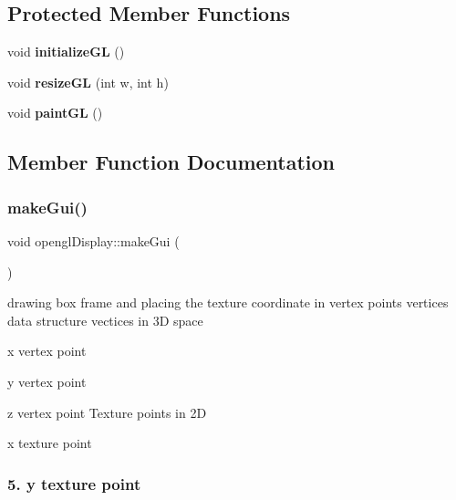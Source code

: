 \subsection*{Protected Member Functions}
\begin{DoxyCompactItemize}
\item 
\mbox{\label{classopengl_display_a348f99a1154f59dbc91d652ec4aaa4b8}} 
void {\bfseries initialize\+GL} ()
\item 
\mbox{\label{classopengl_display_a884e87f0e5459bb1cf203fff034de679}} 
void {\bfseries resize\+GL} (int w, int h)
\item 
\mbox{\label{classopengl_display_a459f873c97a2f7da81a1ec5cc3068f80}} 
void {\bfseries paint\+GL} ()
\end{DoxyCompactItemize}


\subsection{Member Function Documentation}
\mbox{\label{classopengl_display_ab03aeea355ba1de55ce03381ef1c2d62}} 
\subsubsection{\texorpdfstring{make\+Gui()}{makeGui()}}
{\footnotesize\ttfamily void opengl\+Display\+::make\+Gui (\begin{DoxyParamCaption}{ }\end{DoxyParamCaption})}

drawing box frame and placing the texture coordinate in vertex points vertices data structure vectices in 3D space
\begin{DoxyEnumerate}
\item x vertex point
\item y vertex point
\item z vertex point Texture points in 2D
\item x texture point \subsubsection*{5. y texture point }
\end{DoxyEnumerate}\mbox{\label{classopengl_display_a2227c65237769f48f1d722e65fd389bd}} 
